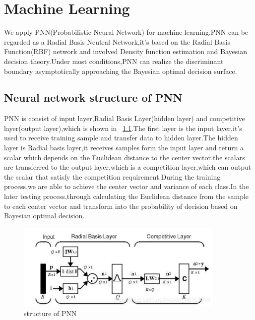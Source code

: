 
\chapter{Machine Learning}
We apply PNN(Probabilistic Neural Network) for machine learning.PNN can be regarded as a Radial Basis Neutral Network,it’s based on the Radial Basis Function(RBF) network and involved Density function estimation and Bayesian decision theory.Under most conditions,PNN can realize the discriminant boundary asymptotically approaching the Bayesian optimal decision surface.
\section{Neural network structure of PNN}
PNN is consist of input layer,Radial Basis Layer(hidden layer) and competitive layer(output layer),which is shown in ~\ref{fig:structure of PNN}.The first layer is the input layer,it’s used to receive training sample and transfer data to hidden layer.The hidden layer is Radial basis layer,it receives samples form the input layer and return a scalar which depends on the Euclidean distance to the center vector.the scalars are transferred to the output layer,which is a competition layer,which can output the scalar that satisfy the competition requirement.During the training process,we are able to achieve the center vector and variance of each class.In the later testing process,through calculating the Euclidean distance from the sample to each center vector and transform into the probability of decision based on Bayesian optimal decision.
\begin{figure}
    \centering
    \includegraphics[width=0.9\textwidth]{figures/PNN neural network.png}
    \caption{structure of PNN}
    \label{fig:structure of PNN}
\end{figure}
